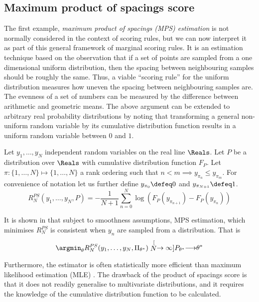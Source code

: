 \subsection{Maximum product of spacings score}

The first example, \emph{maximum product of spacings (MPS) estimation} is not normally considered in the context of scoring rules, but we can now interpret it as part of this general framework of marginal scoring rules. It is an estimation technique based on the observation that if a set of points are sampled from a one dimensional uniform distribution, then the spacing between neighbouring samples should be roughly the same. Thus, a viable ``scoring rule'' for the uniform distribution measures how uneven the spacing between neighbouring samples are. The evenness of a set of numbers can be measured by the difference between arithmetic and geometric means. The above argument can be extended to arbitrary real probability distributions by noting that transforming a general non-uniform random variable by its cumulative distribution function results in a uniform random variable between $0$ and $1$.

\begin{definition}
	Let $y_1,\ldots,y_N$ independent random variables on the real line $\Reals$. Let $P$ be a distribution over $\Reals$ with cumulative distribution function $F_{P}$. Let $\pi:\{1,\ldots,N\}\mapsto\{1,\ldots,N\}$ a rank ordering such that $n<m \implies y_{\pi_{n}}\leq y_{\pi_{m}}$. For convenience of notation let us further define $y_{\pi_0}\defeq 0$ and $y_{\pi_{N+1}}\defeq 1$.
	\begin{equation}
		R^{PS}_N(y_1,\ldots,y_N,P) = - \frac{1}{N+1} \sum_{n=0}^{N} \log \left(F_P\left(y_{\pi_{n+1}}\right) - F_P\left(y_{\pi_{n}}\right) \right)
	\end{equation}
\end{definition}

It is shown in \citep{http://fir.nes.ru/tildegkosenok/MPS.pdf} that subject to smoothness assumptions, MPS estimation, which minimises $R^{PS}_N$ is consistent when $y_n$ are sampled \iid from a distribution. That is
\begin{align}
\argmin_{\theta}R^{PS}_{N}(y_1,\ldots,y_N,\Pi_{\theta^{*}}) \stackrel[N\rightarrow\infty]{P_{\theta^{*}}}{\longrightarrow} \theta^{*}
\end{align}

Furthermore, the estimator is often statistically more efficient than maximum likelihood estimation (MLE) \citep{http://fir.nes.ru/tildegkosenok/MPS.pdf}. The drawback of the product of spacings score is that it does not readily generalise to multivariate distributions, and it requires the knowledge of the cumulative distribution function to be calculated.

